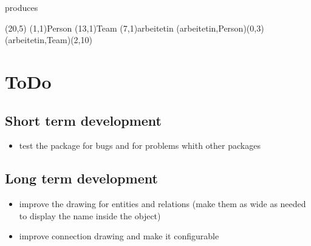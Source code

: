 \documentclass[a4paper,11pt]{article}
\begin{document}
produces

\begin{schema}(20,5)
  \entity(1,1){Person}
  \entity(13,1){Team}
  \relation(7,1){arbeitetin}
  \conn(arbeitetin,Person){(0,3)}
  \conn(arbeitetin,Team){(2,10)}
\end{schema}


\section{ToDo}

\subsection{Short term development}

\begin{itemize}
\item test the package for bugs and for problems whith other packages
\end{itemize}

\subsection{Long term development}

\begin{itemize}
\item improve the drawing for entities and relations (make them as wide as
  needed to display the name inside the object)
\item improve connection drawing and make it configurable
\end{itemize}
\end{document}

